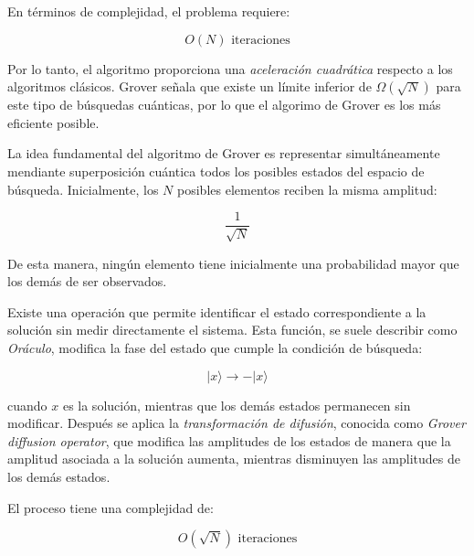             En términos de complejidad, el problema requiere:

            \begin{equation}
                O(N) \text{ iteraciones}
            \end{equation}

            Por lo tanto, el algoritmo proporciona una \textit{aceleración cuadrática} respecto a los algoritmos clásicos. Grover señala que existe un límite inferior
            de $\Omega(\sqrt{N})$ para este tipo de búsquedas cuánticas, por lo que el algorimo de Grover es los más eficiente posible.

            La idea fundamental del algoritmo de Grover es representar simultáneamente mendiante superposición cuántica todos los posibles estados del espacio de búsqueda. 
            Inicialmente, los $N$ posibles elementos reciben la misma amplitud:

            \begin{equation}
                \frac{1}{\sqrt{N}}
            \end{equation}

            De esta manera, ningún elemento tiene inicialmente una probabilidad mayor que los demás de ser observados. 

            Existe una operación que permite identificar el estado correspondiente a la solución sin medir directamente el sistema. Esta función, se suele describir como \textit{Oráculo},
            modifica la fase del estado que cumple la condición de búsqueda:

            \begin{equation}
                |x\rangle \rightarrow -|x\rangle
            \end{equation}

            cuando $x$ es la solución, mientras que los demás estados permanecen sin modificar. Después se aplica la \textit{transformación de difusión}, conocida como \textit{Grover diffusion operator},
            que modifica las amplitudes de los estados de manera que la amplitud asociada a la solución aumenta, mientras disminuyen las amplitudes
            de los demás estados. 

            El proceso tiene una complejidad de:

            \begin{equation}
                O(\sqrt{N}) \text{ iteraciones}
            \end{equation}


